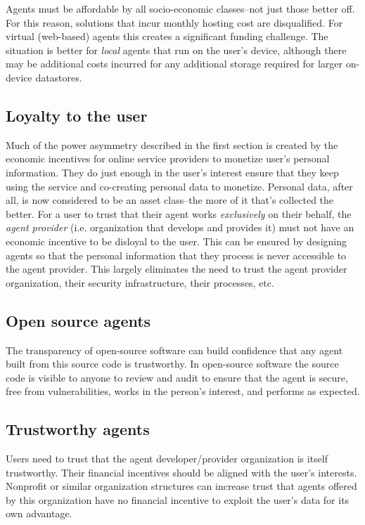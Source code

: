 \documentclass[11pt, oneside]{article}   	%
\begin{document}
Agents must be affordable by all socio-economic classes--not just those better off. For this reason, solutions that incur monthly hosting cost are disqualified. For virtual (web-based) agents this creates a significant funding challenge. The situation is better for \emph{local} agents that run on the user's device, although there may be additional costs incurred for any additional storage required for larger on-device datastores.


\subsection{Loyalty to the user}
Much of the power asymmetry described in the first section is created by the economic incentives for online service providers to monetize user's personal information. They do just enough in the user's interest ensure that they keep using the service and co-creating personal data to monetize. Personal data, after all, is now considered to be an asset class--the more of it that's collected the better. For a user to trust that their agent works \emph{exclusively} on their behalf, the \emph{agent provider} (i.e. organization that develops and provides it) must not have an economic incentive to be disloyal to the user. This can be ensured by designing agents so that the personal information that they process is never accessible to the agent provider. This largely eliminates the need to trust the agent provider organization, their security infrastructure, their processes, etc.

\subsection{Open source agents}

The transparency of open-source software can build confidence that any agent built from this source code is trustworthy. In open-source software the source code is visible to anyone to review and audit to ensure that the agent is secure, free from vulnerabilities, works in the person's interest, and performs as expected.

\subsection{Trustworthy agents}

Users need to trust that the agent developer/provider organization is itself trustworthy. Their financial incentives should be aligned with the user's interests. Nonprofit or similar organization structures can increase trust that agents offered by this organization have no financial incentive to exploit the user's data for its own advantage. 
\end{document}
